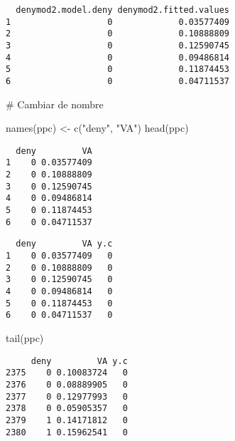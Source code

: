 \documentclass[
  letterpaper,
  DIV=11,
  numbers=noendperiod]{scrreprt}
\newenvironment{Shaded}{\begin{snugshade}}{\end{snugshade}}
\newcommand{\CommentTok}[1]{\textcolor[rgb]{0.37,0.37,0.37}{#1}}
\newcommand{\DecValTok}[1]{\textcolor[rgb]{0.68,0.00,0.00}{#1}}
\newcommand{\FloatTok}[1]{\textcolor[rgb]{0.68,0.00,0.00}{#1}}
\newcommand{\FunctionTok}[1]{\textcolor[rgb]{0.28,0.35,0.67}{#1}}
\newcommand{\NormalTok}[1]{\textcolor[rgb]{0.00,0.23,0.31}{#1}}
\newcommand{\OtherTok}[1]{\textcolor[rgb]{0.00,0.23,0.31}{#1}}
\newcommand{\SpecialCharTok}[1]{\textcolor[rgb]{0.37,0.37,0.37}{#1}}
\newcommand{\StringTok}[1]{\textcolor[rgb]{0.13,0.47,0.30}{#1}}
\begin{document}
\begin{verbatim}
  denymod2.model.deny denymod2.fitted.values
1                   0             0.03577409
2                   0             0.10888809
3                   0             0.12590745
4                   0             0.09486814
5                   0             0.11874453
6                   0             0.04711537
\end{verbatim}

\begin{Shaded}
\begin{Highlighting}[]
\CommentTok{\# Cambiar de nombre}

\FunctionTok{names}\NormalTok{(ppc) }\OtherTok{\textless{}{-}} \FunctionTok{c}\NormalTok{(}\StringTok{"deny"}\NormalTok{, }\StringTok{"VA"}\NormalTok{)}
\FunctionTok{head}\NormalTok{(ppc)}
\end{Highlighting}
\end{Shaded}

\begin{verbatim}
  deny         VA
1    0 0.03577409
2    0 0.10888809
3    0 0.12590745
4    0 0.09486814
5    0 0.11874453
6    0 0.04711537
\end{verbatim}

\begin{Shaded}
\end{Shaded}

\begin{verbatim}
  deny         VA y.c
1    0 0.03577409   0
2    0 0.10888809   0
3    0 0.12590745   0
4    0 0.09486814   0
5    0 0.11874453   0
6    0 0.04711537   0
\end{verbatim}

\begin{Shaded}
\begin{Highlighting}[]
\FunctionTok{tail}\NormalTok{(ppc)}
\end{Highlighting}
\end{Shaded}

\begin{verbatim}
     deny         VA y.c
2375    0 0.10083724   0
2376    0 0.08889905   0
2377    0 0.12977993   0
2378    0 0.05905357   0
2379    1 0.14171812   0
2380    1 0.15962541   0
\end{verbatim}
\end{document}
